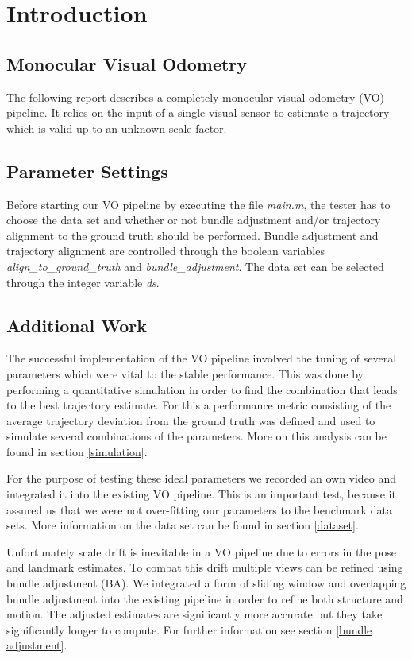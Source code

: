 \chapter{Introduction}
\vspace{-10mm}
\section{Monocular Visual Odometry}
The following report describes a completely monocular visual odometry (VO) pipeline. It relies on the input of a single visual sensor to estimate a trajectory which is valid up to an unknown scale factor.

\section{Parameter Settings}
\label{params}
Before starting our VO pipeline by executing the file \emph{main.m}, the tester has to choose the data set and whether or not bundle adjustment and/or trajectory alignment to the ground truth should be performed. Bundle adjustment and trajectory alignment are controlled through the boolean variables \emph{align\_to\_ground\_truth} and \emph{bundle\_adjustment}. The data set can be selected through the integer variable \emph{ds}.

\section{Additional Work}
The successful implementation of the VO pipeline involved the tuning of several parameters which were vital to the stable performance. This was done by performing a quantitative simulation in order to find the combination that leads to the best trajectory estimate. For this a performance metric consisting of the average trajectory deviation from the ground truth was defined and used to simulate several combinations of the parameters. More on this analysis can be found in section \ref{simulation}. \par
For the purpose of testing these ideal parameters we recorded an own video and integrated it into the existing VO pipeline. This is an important test, because it assured us that we were not over-fitting our parameters to the benchmark data sets. More information on the data set can be found in section \ref{dataset}. \par
Unfortunately scale drift is inevitable in a VO pipeline due to errors in the pose and landmark estimates. To combat this drift multiple views can be refined using bundle adjustment (BA). We integrated a form of sliding window and overlapping bundle adjustment into the existing pipeline in order to refine both structure and motion. The adjusted estimates are significantly more accurate but they take significantly longer to compute. For further information see section \ref{bundle adjustment}.
